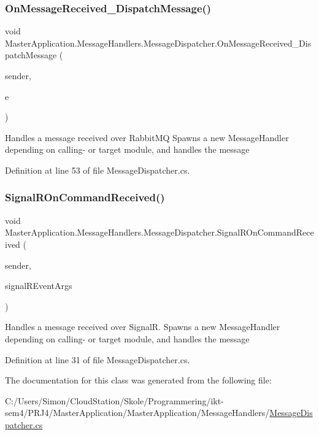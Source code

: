 \subsubsection{\texorpdfstring{On\+Message\+Received\+\_\+\+Dispatch\+Message()}{OnMessageReceived\_DispatchMessage()}}
{\footnotesize\ttfamily void Master\+Application.\+Message\+Handlers.\+Message\+Dispatcher.\+On\+Message\+Received\+\_\+\+Dispatch\+Message (\begin{DoxyParamCaption}\item[{object}]{sender,  }\item[{Basic\+Deliver\+Event\+Args}]{e }\end{DoxyParamCaption})\hspace{0.3cm}{\ttfamily [private]}}

Handles a message received over Rabbit\+MQ Spawns a new Message\+Handler depending on calling-\/ or target module, and handles the message 

Definition at line 53 of file Message\+Dispatcher.\+cs.

\mbox{\label{class_master_application_1_1_message_handlers_1_1_message_dispatcher_ade63abb94bd2bd5c1efaa4231ca99bde}} 
\subsubsection{\texorpdfstring{Signal\+R\+On\+Command\+Received()}{SignalROnCommandReceived()}}
{\footnotesize\ttfamily void Master\+Application.\+Message\+Handlers.\+Message\+Dispatcher.\+Signal\+R\+On\+Command\+Received (\begin{DoxyParamCaption}\item[{object}]{sender,  }\item[{\mbox{\hyperlink{class_master_application_1_1_signal_r_event_args}{Signal\+R\+Event\+Args}}}]{signal\+R\+Event\+Args }\end{DoxyParamCaption})\hspace{0.3cm}{\ttfamily [private]}}

Handles a message received over SignalR. Spawns a new Message\+Handler depending on calling-\/ or target module, and handles the message 

Definition at line 31 of file Message\+Dispatcher.\+cs.



The documentation for this class was generated from the following file\+:\begin{DoxyCompactItemize}
\item 
C\+:/\+Users/\+Simon/\+Cloud\+Station/\+Skole/\+Programmering/ikt-\/sem4/\+P\+R\+J4/\+Master\+Application/\+Master\+Application/\+Message\+Handlers/\mbox{\hyperlink{_message_dispatcher_8cs}{Message\+Dispatcher.\+cs}}\end{DoxyCompactItemize}
